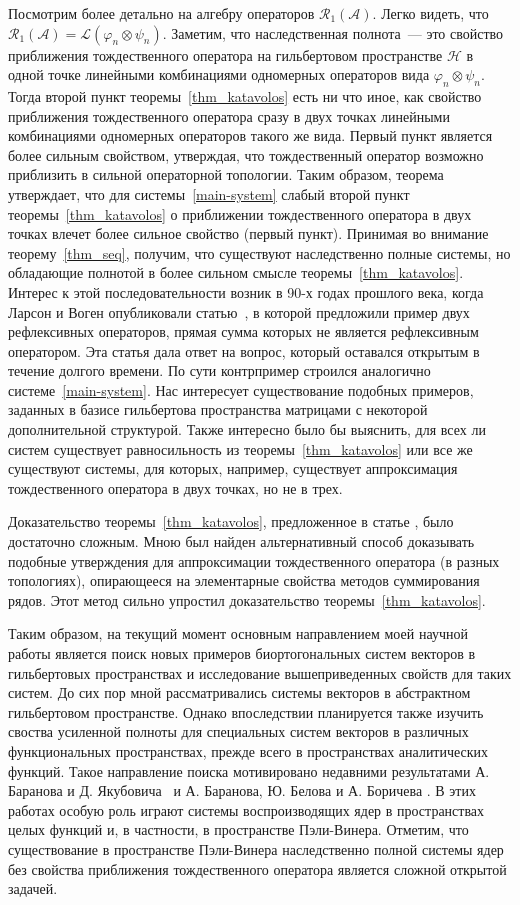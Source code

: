 \documentclass[a4paper,12pt]{article}
\renewcommand{\cal}[1]{\mathcal{#1}}
\renewcommand{\phi}{\varphi}
\numberwithin{prop_under_lemma}{lemma}
\begin{document}
Посмотрим более детально на алгебру операторов $\cal{R}_1(\cal{A})$.
Легко видеть, что $\cal{R}_1(\cal{A})=\cal{L}(\phi_n \otimes \psi_n)$.
Заметим, что наследственная полнота~--- это свойство приближения тождественного оператора на гильбертовом пространстве $\cal{H}$ в одной точке 
  линейными комбинациями одномерных операторов вида $\phi_n \otimes \psi_n$.
Тогда второй пункт теоремы~\ref{thm_katavolos} есть ни что иное, как свойство приближения тождественного оператора сразу в двух точках 
  линейными комбинациями одномерных операторов такого же вида.
Первый пункт является более сильным свойством, утверждая, 
  что тождественный оператор возможно приблизить в сильной операторной топологии.
Таким образом, теорема утверждает, что для системы~\eqref{main-system} слабый второй пункт теоремы~\ref{thm_katavolos} 
  о приближении тождественного оператора в двух точках влечет более сильное свойство (первый пункт).
Принимая во внимание теорему~\ref{thm_seq}, получим, что существуют наследственно полные системы, но обладающие полнотой в более сильном смысле теоремы~\ref{thm_katavolos}.
Интерес к этой последовательности возник в 90-х годах прошлого века, когда Ларсон и Воген
  опубликовали статью~\cite{wogen}, в которой предложили пример двух рефлексивных операторов,
  прямая сумма которых не является рефлексивным оператором. 
Эта статья дала ответ на вопрос, который оставался открытым в течение долгого времени.
По сути контрпример строился аналогично системе~\eqref{main-system}.
Нас интересует существование подобных примеров, заданных в базисе гильбертова пространства матрицами с некоторой дополнительной структурой.
Также интересно было бы выяснить, для всех ли систем существует равносильность из теоремы~\ref{thm_katavolos} или 
  все же существуют системы, для которых, например, существует аппроксимация тождественного оператора в двух точках, но не в трех.

Доказательство теоремы~\ref{thm_katavolos}, предложенное в статье \cite{katavolos}, было достаточно сложным.
Мною был найден альтернативный способ доказывать подобные утверждения для аппроксимации тождественного оператора (в разных топологиях),
  опирающееся на элементарные свойства методов суммирования рядов.
Этот метод сильно упростил доказательство теоремы~\ref{thm_katavolos}.

Таким образом, на текущий момент основным направлением моей научной работы является поиск новых примеров биортогональных систем векторов в гильбертовых пространствах и исследование вышеприведенных свойств для таких систем. До сих пор мной рассматривались системы векторов в абстрактном гильбертовом пространстве. Однако впоследствии планируется также изучить своства усиленной полноты для специальных систем векторов в различных функциональных пространствах, прежде всего в пространствах аналитических функций. Такое направление поиска мотивировано недавними результатами А. Баранова и Д. Якубовича~\cite{ad_preprint} и А. Баранова, Ю. Белова и А. Боричева \cite{bbb}. В этих работах особую роль играют системы воспроизводящих ядер в пространствах целых функций и, в частности, в пространстве Пэли-Винера. Отметим, что существование в пространстве Пэли-Винера наследственно полной системы ядер без свойства приближения тождественного оператора является сложной открытой задачей.
\end{document}
